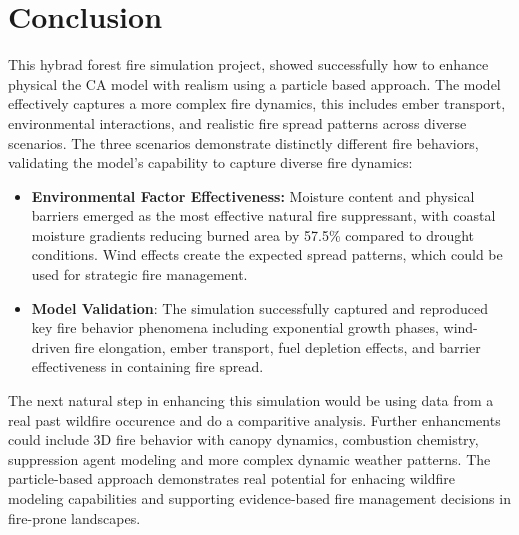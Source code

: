 \section{Conclusion}
This hybrad forest fire simulation project, showed successfully how to enhance physical the CA model with realism using a particle based approach. The model effectively captures a more complex fire dynamics, this includes ember transport, environmental interactions, and realistic fire spread patterns across diverse scenarios.\newline
The three scenarios demonstrate distinctly different fire behaviors, validating the model's capability to capture diverse fire dynamics:
\begin{itemize}
	\item \textbf{Environmental Factor Effectiveness:} Moisture content and physical barriers emerged as the most effective natural fire suppressant, with coastal moisture gradients reducing burned area by 57.5\% compared to drought conditions. Wind effects create the expected spread patterns, which could be used for strategic fire management.
	\item \textbf{Model Validation}: The simulation successfully captured and reproduced key fire behavior phenomena including exponential growth phases, wind-driven fire elongation, ember transport, fuel depletion effects, and barrier effectiveness in containing fire spread.
\end{itemize}
The next natural step in enhancing this simulation would be using data from a real past wildfire occurence and do a comparitive analysis. Further enhancments could include 3D fire behavior with canopy dynamics, combustion chemistry, suppression agent modeling and more complex dynamic weather patterns.\newline
The particle-based approach demonstrates real potential for enhacing wildfire modeling capabilities and supporting evidence-based fire management decisions in fire-prone landscapes.

